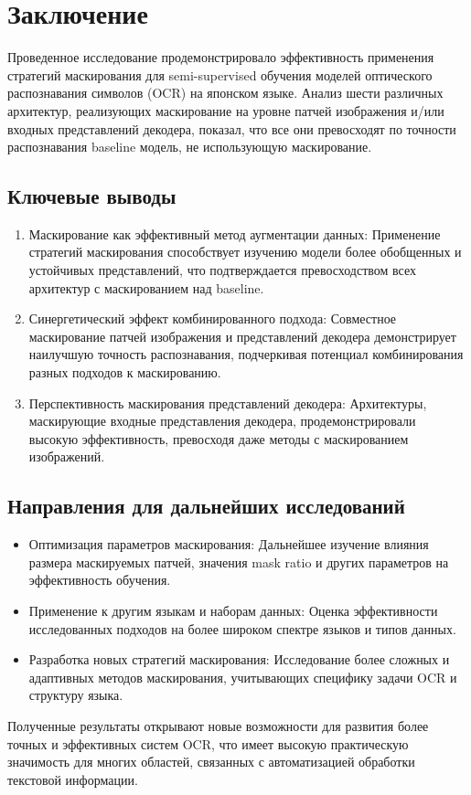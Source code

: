 \section{Заключение}
\label{sec:Chapter5} 

Проведенное исследование продемонстрировало эффективность применения стратегий маскирования для semi-supervised обучения моделей оптического распознавания символов (OCR) на японском языке. Анализ шести различных архитектур, реализующих маскирование на уровне патчей изображения и/или входных представлений декодера, показал, что все они превосходят по точности распознавания baseline модель, не использующую маскирование.

\subsection{Ключевые выводы}
\begin{enumerate}
  \item Маскирование как эффективный метод аугментации данных: Применение стратегий маскирования способствует изучению модели более обобщенных и устойчивых представлений, что подтверждается превосходством всех архитектур с маскированием над baseline.

  \item Синергетический эффект комбинированного подхода: Совместное маскирование патчей изображения и представлений декодера демонстрирует наилучшую точность распознавания, подчеркивая потенциал комбинирования разных подходов к маскированию.

  \item Перспективность маскирования представлений декодера: Архитектуры, маскирующие входные представления декодера, продемонстрировали высокую эффективность, превосходя даже методы с маскированием изображений. 
\end{enumerate}

\subsection{Направления для дальнейших исследований}

\begin{itemize}
  \item Оптимизация параметров маскирования: Дальнейшее изучение влияния размера маскируемых патчей, значения mask ratio и других параметров на эффективность обучения.

  \item Применение к другим языкам и наборам данных: Оценка эффективности исследованных подходов на более широком спектре языков и типов данных.

  \item Разработка новых стратегий маскирования: Исследование более сложных и адаптивных методов маскирования, учитывающих специфику задачи OCR и структуру языка. 
\end{itemize}
Полученные результаты открывают новые возможности для развития более точных и эффективных систем OCR, что имеет высокую практическую значимость для многих областей, связанных с автоматизацией обработки текстовой информации.
\newpage